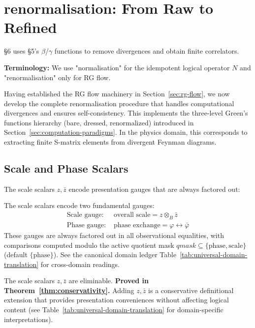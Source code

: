 \section{renormalisation: From Raw to Refined}
\label{sec:renormalisation}

§6 uses §5's $\beta$/$\gamma$ functions to remove divergences and obtain finite correlators.

\textbf{Terminology:} We use "normalisation" for the idempotent logical operator $N$ and "renormalisation" only for RG flow.

Having established the RG flow machinery in Section~\ref{sec:rg-flow}, we now develop the complete renormalisation procedure that handles computational divergences and ensures self-consistency. This implements the three-level Green's functions hierarchy (bare, dressed, renormalized) introduced in Section~\ref{sec:computation-paradigms}. In the physics domain, this corresponds to extracting finite S-matrix elements from divergent Feynman diagrams.

\subsection{Scale and Phase Scalars}

The scale scalars $z, \bar{z}$ encode presentation gauges that are always factored out:

\begin{definition}
\label{def:scale-phase-gauges}
The scale scalars encode two fundamental gauges:
\begin{align}
\text{Scale gauge: } &\text{overall scale} = z \otimes_B \bar{z} \\
\text{Phase gauge: } &\text{phase exchange} = \varphi \leftrightarrow \bar{\varphi}
\end{align}
These gauges are always factored out in all observational equalities, with comparisons computed modulo the active quotient mask $qmask \subseteq \{\text{phase}, \text{scale}\}$ (default $\{\text{phase}\}$). See the canonical domain ledger Table~\ref{tab:universal-domain-translation} for cross-domain readings.
\end{definition}

\begin{theorem}
\label{thm:eliminability-auxiliaries}
The scale scalars $z, \bar{z}$ are eliminable. \textbf{Proved in Theorem~\ref{thm:conservativity}.} Adding $z, \bar{z}$ is a conservative definitional extension that provides presentation conveniences without affecting logical content (see Table~\ref{tab:universal-domain-translation} for domain-specific interpretations).
\end{theorem}

